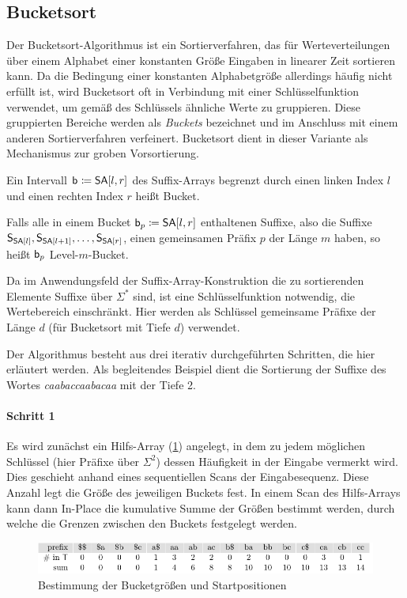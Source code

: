 \subsection{Bucketsort}
\label{section:bucketsort}

Der  Bucketsort-Algorithmus \cite[Kapitel 8.2 (dort unter dem Namen \emph{counting sort})]{Cormen2009} ist ein Sortierverfahren, das für Werteverteilungen über einem Alphabet einer konstanten Größe Eingaben in linearer Zeit sortieren kann. Da die Bedingung einer konstanten Alphabetgröße allerdings häufig nicht erfüllt ist, wird Bucketsort oft in Verbindung mit einer Schlüsselfunktion verwendet, um gemäß des Schlüssels \glqq ähnliche\grqq{} Werte zu gruppieren. Diese gruppierten Bereiche werden als \emph{Buckets} bezeichnet und im Anschluss mit einem anderen Sortierverfahren verfeinert. Bucketsort dient in dieser Variante als Mechanismus zur groben Vorsortierung.\par
{}
\begin{definition}[Bucket]
	\label{def:bucket}
	Ein Intervall \(\bucket{} \coloneqq \sa[l, r]\) des Suffix-Arrays begrenzt durch einen linken Index \(l\) und einen rechten Index \(r\) heißt Bucket.\par
    Falls alle in einem Bucket \(\bucket{p} \coloneqq \sa[l, r]\) enthaltenen Suffixe, also die Suffixe \(\suffix{\sa[l]}, \suffix{\sa[l+1]}, \ldots, \suffix{\sa[r]}\), einen gemeinsamen Präfix \(p\) der Länge \(m\) haben, so heißt \(\mathsf{b}_{p}\) Level-\(m\)-Bucket.
\end{definition}
Da im Anwendungsfeld der Suffix-Array-Konstruktion die zu sortierenden Elemente Suffixe über \(\Sigma^\ast\) sind, ist eine Schlüsselfunktion notwendig, die Wertebereich einschränkt. Hier werden als Schlüssel gemeinsame Präfixe der Länge \(d\) (für Bucketsort mit Tiefe \(d\)) verwendet.\par
Der Algorithmus besteht aus drei iterativ durchgeführten Schritten, die hier erläutert werden. Als begleitendes Beispiel dient die Sortierung der Suffixe des Wortes \emph{caabaccaabacaa} mit der Tiefe 2.
\paragraph{Schritt 1}
Es wird zunächst ein Hilfs-Array (\cref{bucketsort:bkt}) angelegt, in dem zu jedem möglichen Schlüssel (hier Präfixe über \(\Sigma^2\)) dessen Häufigkeit in der Eingabe vermerkt wird. Dies geschieht anhand eines sequentiellen Scans der Eingabesequenz. Diese Anzahl legt die Größe des jeweiligen Buckets fest. In einem Scan des Hilfs-Arrays kann dann In-Place die kumulative Summe der Größen bestimmt werden, durch welche die Grenzen zwischen den Buckets festgelegt werden.
\begin{figure}[ht]
    \includegraphics[width=\textwidth]{kapitel/4_komponenten/sortieralgorithmen/bucketsort/step_01/bkt/image.pdf}
    \caption{Bestimmung der Bucketgrößen und Startpositionen}
    \label{bucketsort:bkt}
\end{figure}
